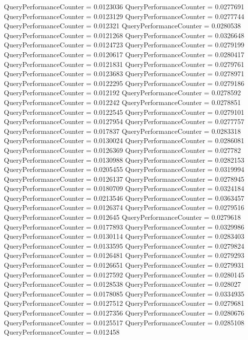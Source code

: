 \documentclass[9pt]{article}
\theoremstyle{plain}
\theoremstyle{definition}
\theoremstyle{remark}
\numberwithin{equation}{section}
\begin{document}
QueryPerformanceCounter  =  0.0123036
QueryPerformanceCounter  =  0.0277691
QueryPerformanceCounter  =  0.0123129
QueryPerformanceCounter  =  0.0277744
QueryPerformanceCounter  =  0.012321
QueryPerformanceCounter  =  0.0280538
QueryPerformanceCounter  =  0.0121268
QueryPerformanceCounter  =  0.0326648
QueryPerformanceCounter  =  0.0124723
QueryPerformanceCounter  =  0.0279199
QueryPerformanceCounter  =  0.0120617
QueryPerformanceCounter  =  0.0280417
QueryPerformanceCounter  =  0.0121831
QueryPerformanceCounter  =  0.0279761
QueryPerformanceCounter  =  0.0123683
QueryPerformanceCounter  =  0.0278971
QueryPerformanceCounter  =  0.0122295
QueryPerformanceCounter  =  0.0279186
QueryPerformanceCounter  =  0.012192
QueryPerformanceCounter  =  0.0278592
QueryPerformanceCounter  =  0.012242
QueryPerformanceCounter  =  0.0278851
QueryPerformanceCounter  =  0.0122545
QueryPerformanceCounter  =  0.0279101
QueryPerformanceCounter  =  0.0127954
QueryPerformanceCounter  =  0.0277757
QueryPerformanceCounter  =  0.017837
QueryPerformanceCounter  =  0.0283318
QueryPerformanceCounter  =  0.0130024
QueryPerformanceCounter  =  0.0286081
QueryPerformanceCounter  =  0.0126369
QueryPerformanceCounter  =  0.027782
QueryPerformanceCounter  =  0.0130988
QueryPerformanceCounter  =  0.0282153
QueryPerformanceCounter  =  0.0205455
QueryPerformanceCounter  =  0.0319994
QueryPerformanceCounter  =  0.0126137
QueryPerformanceCounter  =  0.0278945
QueryPerformanceCounter  =  0.0180709
QueryPerformanceCounter  =  0.0324184
QueryPerformanceCounter  =  0.0213546
QueryPerformanceCounter  =  0.0363457
QueryPerformanceCounter  =  0.0126374
QueryPerformanceCounter  =  0.0279516
QueryPerformanceCounter  =  0.012645
QueryPerformanceCounter  =  0.0279618
QueryPerformanceCounter  =  0.0177893
QueryPerformanceCounter  =  0.0329986
QueryPerformanceCounter  =  0.0130114
QueryPerformanceCounter  =  0.0283403
QueryPerformanceCounter  =  0.0133595
QueryPerformanceCounter  =  0.0279824
QueryPerformanceCounter  =  0.0126481
QueryPerformanceCounter  =  0.0279293
QueryPerformanceCounter  =  0.0126651
QueryPerformanceCounter  =  0.0279931
QueryPerformanceCounter  =  0.0127592
QueryPerformanceCounter  =  0.0280145
QueryPerformanceCounter  =  0.0128538
QueryPerformanceCounter  =  0.028027
QueryPerformanceCounter  =  0.0178085
QueryPerformanceCounter  =  0.0334935
QueryPerformanceCounter  =  0.0127512
QueryPerformanceCounter  =  0.0279681
QueryPerformanceCounter  =  0.0127356
QueryPerformanceCounter  =  0.0280676
QueryPerformanceCounter  =  0.0125517
QueryPerformanceCounter  =  0.0285108
QueryPerformanceCounter  =  0.012458
\end{document}
